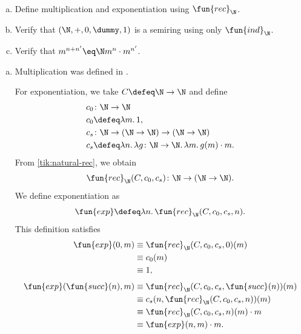 \begin{exr}${}$
    \begin{enumerate}[a),font=\upshape]
        \item Define multiplication and exponentiation using\/ $\fun{rec}_\N$.

        \item Verify that\/ $(\N,+,0,\dummy,1)$ is a semiring using only\/ $\fun{ind}_\N$.

        \item Verify that $m^{n+n'}\eq\N m^n\cdot m^{n'}$.
    \end{enumerate}
\end{exr}

\begin{solution}
    \begin{enumerate}[a)]
        \item Multiplication was defined in .

        For exponentiation, we take\/ $C\defeq\N\to\N$ and define
        \begin{align*}
            c_0 &\colon \N\to\N \\
            c_0 &\defeq \lambda m.\,1,\\
            c_s &\colon \N\to(\N\to\N)\to(\N\to\N) \\
            c_s &\defeq \lambda n.\,\lambda g\colon\N\to\N.\,\lambda m.\,g(m)\cdot m.
        \end{align*}
        From \eqref{tik:natural-rec}, we obtain
        \[
            \fun{rec}_\N(C,c_0,c_s)\colon\N\to(\N\to\N).
        \]
        We define exponentiation as
        \[
            \fun{exp}\defeq\lambda n.\,\fun{rec}_\N(C,c_0,c_s,n).
        \]
        This definition satisfies
        \begin{align*}
            \fun{exp}(0,m)
                &\equiv \fun{rec}_\N(C,c_0,c_s,0)(m) \\
                &\equiv c_0(m)\\
                &\equiv 1, \\[1ex]
            \fun{exp}(\fun{succ}(n),m)
                &\equiv \fun{rec}_\N(C,c_0,c_s,\fun{succ}(n))(m)\\
                &\equiv c_s(n,\fun{rec}_\N(C,c_0,c_s,n))(m)\\
                &\equiv \fun{rec}_\N(C,c_0,c_s,n)(m)\cdot m\\
                &\equiv \fun{exp}(n,m)\cdot m.
        \end{align*}


\end{enumerate}
\end{solution}
